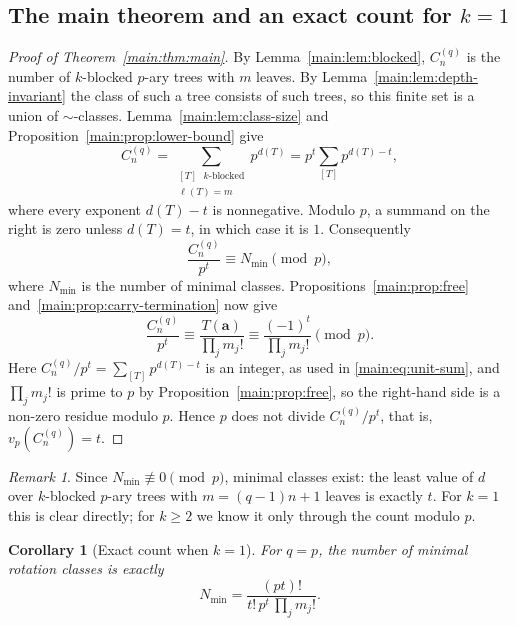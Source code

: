 \documentclass[11pt]{article}
\newtheorem{corollary}[theorem]{Corollary}
\theoremstyle{definition}
\theoremstyle{remark}
\newtheorem{remark}[theorem]{Remark}
\numberwithin{equation}{section}
\numberwithin{figure}{section}
\newcommand{\fc}{C_n^{(q)}}
\begin{document}
\subsection{The main theorem and an exact count for \texorpdfstring{$k=1$}{k=1}}
\begin{proof}[Proof of Theorem~\ref{main:thm:main}]
By Lemma~\ref{main:lem:blocked}, $\fc$ is the number of $k$-blocked $p$-ary trees with $m$ leaves.  By Lemma~\ref{main:lem:depth-invariant} the class of such a tree consists of such trees, so this finite set is a union of $\sim$-classes.  Lemma~\ref{main:lem:class-size} and Proposition~\ref{main:prop:lower-bound} give
\[
 \fc=\sum_{\substack{[T]\text{ $k$-blocked}\\\ell(T)=m}}p^{d(T)}
 =p^t\sum_{[T]}p^{d(T)-t},
\]
where every exponent $d(T)-t$ is nonnegative.  Modulo $p$, a summand on the right is zero unless $d(T)=t$, in which case it is $1$.  Consequently
\begin{equation}\label{main:eq:unit-sum}
 \frac{\fc}{p^t}\equiv N_{\min}\pmod p,
\end{equation}
where $N_{\min}$ is the number of minimal classes.  Propositions~\ref{main:prop:free} and~\ref{main:prop:carry-termination} now give
\[
 \frac{\fc}{p^t}\equiv\frac{T(\mathbf a)}{\prod_jm_j!}
 \equiv\frac{(-1)^t}{\prod_jm_j!}\pmod p.
\]
Here $\fc/p^t=\sum_{[T]}p^{d(T)-t}$ is an integer, as used in \eqref{main:eq:unit-sum}, and $\prod_jm_j!$ is prime to $p$ by Proposition~\ref{main:prop:free}, so the right-hand side is a non-zero residue modulo $p$.  Hence $p$ does not divide $\fc/p^t$, that is, $v_p(\fc)=t$.
\end{proof}
\begin{remark}
Since $N_{\min}\not\equiv0\pmod p$, minimal classes exist: the least value of $d$ over $k$-blocked $p$-ary trees with $m=(q-1)n+1$ leaves is exactly $t$.  For $k=1$ this is clear directly; for $k\ge2$ we know it only through the count modulo $p$.
\end{remark}
\begin{corollary}[Exact count when $k=1$]\label{main:cor:exact-count}
For $q=p$, the number of minimal rotation classes is exactly
\[
 N_{\min}=\frac{(pt)!}{t!\,p^t\,\prod_jm_j!}.
\]
\end{corollary}
\end{document}
